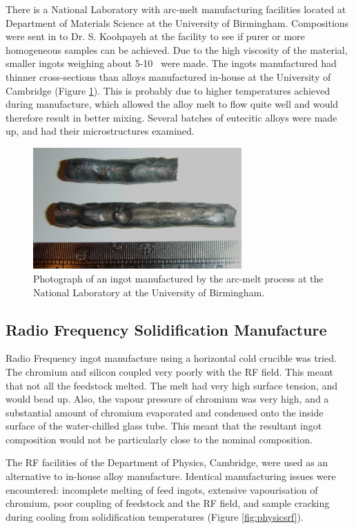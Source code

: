 There is a National Laboratory with arc-melt manufacturing facilities located at Department of Materials Science at the University of Birmingham.  Compositions were sent in to Dr.  S. Koohpayeh at the facility to see if purer or more homogeneous samples can be achieved.  Due to the high viscosity of the material, smaller ingots weighing about 5-10 \gram\ were made.  The ingots manufactured had thinner cross-sections than alloys manufactured in-house at the University of Cambridge (Figure \ref{fig:bhamarc}).  This is probably due to higher temperatures achieved during manufacture, which allowed the alloy melt to flow quite well and would therefore result in better mixing.  Several batches of eutecitic alloys were made up, and had their microstructures examined.

%
\begin{figure}[H]
\begin{center}
\includegraphics[width=8cm]{bhamarc}
\caption{Photograph of an ingot manufactured by the arc-melt process at the National Laboratory at the University of Birmingham.}
\label{fig:bhamarc}
\end{center}
\end{figure}
%


\subsection{Radio Frequency Solidification Manufacture}

Radio Frequency ingot manufacture using a horizontal cold crucible was tried.  The chromium and silicon coupled very poorly with the RF field.  This meant that not all the feedstock melted.  The melt had very high surface tension, and would bead up.  Also, the vapour pressure of chromium was very high, and a substantial amount of chromium evaporated and condensed onto the inside surface of the water-chilled glass tube.  This meant that the resultant ingot composition would not be particularly close to the nominal composition.

The RF facilities of the Department of Physics, Cambridge, were used as an alternative to in-house alloy manufacture.  Identical manufacturing issues were encountered: incomplete melting of feed ingots, extensive vapourisation of chromium, poor coupling of feedstock and the RF field, and sample cracking during cooling from solidification temperatures (Figure \ref{fig:physicsrf}). 

